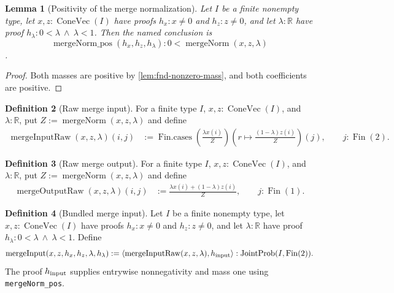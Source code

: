 \documentclass[9pt]{extarticle}
\newtheorem{lemma}{Lemma}[section]
\theoremstyle{definition}
\newtheorem{definition}[lemma]{Definition}
\theoremstyle{remark}
\newcommand{\R}{\mathbb R}
\begin{document}
\begin{lemma}[Positivity of the merge normalization]
\label{lem:fnd-merge-norm-pos}
Let $I$ be a finite nonempty type, let $x,z:\operatorname{ConeVec}(I)$ have
proofs $h_x:x\neq0$ and $h_z:z\neq0$, and let $\lambda:\R$ have proof
$h_\lambda:0<\lambda\ \wedge\ \lambda<1$.  Then the named conclusion is
\[
 \operatorname{mergeNorm\_pos}(h_x,h_z,h_\lambda):
 0<\operatorname{mergeNorm}(x,z,\lambda)
\]
.
\end{lemma}

\begin{proof}
Both masses are positive by \cref{lem:fnd-nonzero-mass}, and both
coefficients are positive.
\end{proof}

\begin{definition}[Raw merge input]
\label{def:fnd-merge-input-raw}
For a finite type $I$, $x,z:\operatorname{ConeVec}(I)$, and $\lambda:\R$,
put $Z:=\operatorname{mergeNorm}(x,z,\lambda)$ and define
\begin{align*}
 \operatorname{mergeInputRaw}(x,z,\lambda)(i,j)
 &:={\operatorname{Fin.cases}}
   \left(\frac{\lambda x(i)}Z\right)
   \left(r\mapsto\frac{(1-\lambda)z(i)}Z\right)(j),
 \qquad j:\operatorname{Fin}(2).
\end{align*}
\end{definition}

\begin{definition}[Raw merge output]
\label{def:fnd-merge-output-raw}
For a finite type $I$, $x,z:\operatorname{ConeVec}(I)$, and $\lambda:\R$,
put $Z:=\operatorname{mergeNorm}(x,z,\lambda)$ and define
\begin{align*}
 \operatorname{mergeOutputRaw}(x,z,\lambda)(i,j)
 &:=\frac{\lambda x(i)+(1-\lambda)z(i)}Z,
 \qquad j:\operatorname{Fin}(1).
\end{align*}
\end{definition}

\begin{definition}[Bundled merge input]
\label{def:fnd-merge-input}
Let $I$ be a finite nonempty type, let $x,z:\operatorname{ConeVec}(I)$ have
proofs $h_x:x\neq0$ and $h_z:z\neq0$, and let $\lambda:\R$ have proof
$h_\lambda:0<\lambda\ \wedge\ \lambda<1$.  Define
\[
 \operatorname{mergeInput}(x,z,h_x,h_z,\lambda,h_\lambda)
 :=\left\langle\operatorname{mergeInputRaw}(x,z,\lambda),
 h_{\rm input}\right\rangle
 :\operatorname{JointProb}(I,\operatorname{Fin}(2)).
\]
The proof $h_{\rm input}$ supplies entrywise nonnegativity and mass one using
\texttt{mergeNorm\_pos}.
\end{definition}
\end{document}
